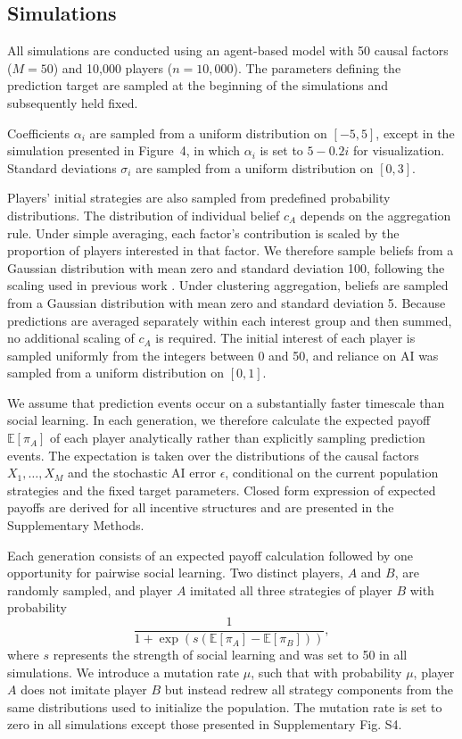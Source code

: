 \documentclass[12pt]{article}
\begin{document}
\subsection*{Simulations}

All simulations are conducted using an agent-based model with 50 causal factors ($M=50$) and 10,000 players ($n=10{,}000$). 
The parameters defining the prediction target are sampled at the beginning of the simulations and subsequently held fixed.

Coefficients $\alpha_i$ are sampled from a uniform distribution on $[-5,5]$, except in the simulation presented in Figure~4, in which $\alpha_i$ is set to $5-0.2i$ for visualization. Standard deviations $\sigma_i$ are sampled from a uniform distribution on $[0,3]$.

Players' initial strategies are also sampled from predefined probability distributions.
The distribution of individual belief $c_A$ depends on the aggregation rule. 
Under simple averaging, each factor's contribution is scaled by the proportion of players interested in that factor. 
We therefore sample beliefs from a Gaussian distribution with mean zero and standard deviation 100, following the scaling used in previous work \citep{wang2025individual}. 
Under clustering aggregation, beliefs are sampled from a Gaussian distribution with mean zero and standard deviation 5. 
Because predictions are averaged separately within each interest group and then summed, no additional scaling of $c_A$ is required. 
The initial interest of each player is sampled uniformly from the integers between 0 and 50, and reliance on AI was sampled from a uniform distribution on $[0,1]$.

We assume that prediction events occur on a substantially faster timescale than social learning. 
In each generation, we therefore calculate the expected payoff $\mathbb{E}[\pi_A]$ of each player analytically rather than explicitly sampling prediction events. 
The expectation is taken over the distributions of the causal factors $X_1,\ldots,X_M$ and the stochastic AI error $\epsilon$, conditional on the current population strategies and the fixed target parameters. 
Closed form expression of expected payoffs are derived for all incentive structures and are presented in the Supplementary Methods.

Each generation consists of an expected payoff calculation followed by one opportunity for pairwise social learning. 
Two distinct players, $A$ and $B$, are randomly sampled, and player $A$ imitated all three strategies of player $B$ with probability
\begin{equation}
\frac{1}{1+\exp\left(s\left(\mathbb{E}[\pi_A]-\mathbb{E}[\pi_B]\right)\right)},
\end{equation}
where $s$ represents the strength of social learning and was set to 50 in all simulations. 
We introduce a mutation rate $\mu$, such that with probability $\mu$, player $A$ does not imitate player $B$ but instead redrew all strategy components from the same distributions used to initialize the population. 
The mutation rate is set to zero in all simulations except those presented in Supplementary Fig. S4.
\end{document}
